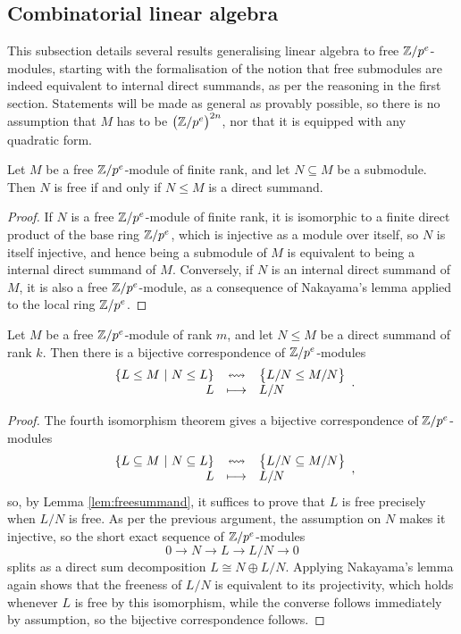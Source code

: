 \subsection{Combinatorial linear algebra}

This subsection details several results generalising linear algebra to free $ \mathbb{Z} / p^e $-modules, starting with the formalisation of the notion that free submodules are indeed equivalent to internal direct summands, as per the reasoning in the first section. Statements will be made as general as provably possible, so there is no assumption that $ M $ has to be $ \br{\ZZ / p^e}^{2n} $, nor that it is equipped with any quadratic form.

\begin{lemma}
\label{lem:freesummand}
Let $ M $ be a free $ \mathbb{Z} / p^e $-module of finite rank, and let $ N \subseteq M $ be a submodule. Then $ N $ is free if and only if $ N \le M $ is a direct summand.
\end{lemma}

\begin{proof}
If $ N $ is a free $ \mathbb{Z} / p^e $-module of finite rank, it is isomorphic to a finite direct product of the base ring $ \mathbb{Z} / p^e $, which is injective as a module over itself, so $ N $ is itself injective, and hence being a submodule of $ M $ is equivalent to being a internal direct summand of $ M $. Conversely, if $ N $ is an internal direct summand of $ M $, it is also a free $ \mathbb{Z} / p^e $-module, as a consequence of Nakayama's lemma applied to the local ring $ \mathbb{Z} / p^e $.
\end{proof}

\begin{proposition}
\label{prop:fourthisomorphism}
Let $ M $ be a free $ \mathbb{Z} / p^e $-module of rank $ m $, and let $ N \le M $ be a direct summand of rank $ k $. Then there is a bijective correspondence of $ \mathbb{Z} / p^e $-modules
$$ \bijection{\cbr{L \le M \st N \le L}}{\cbr{L / N \le M / N}}{L}{L / N}. $$
\end{proposition}

\begin{proof}
The fourth isomorphism theorem gives a bijective correspondence of $ \mathbb{Z} / p^e $-modules
$$ \bijection{\cbr{L \subseteq M \st N \subseteq L}}{\cbr{L / N \subseteq M / N}}{L}{L / N}, $$
so, by Lemma \ref{lem:freesummand}, it suffices to prove that $ L $ is free precisely when $ L / N $ is free. As per the previous argument, the assumption on $ N $ makes it injective, so the short exact sequence of $ \mathbb{Z} / p^e $-modules
$$ 0 \to N \to L \to L / N \to 0 $$
splits as a direct sum decomposition $ L \cong N \oplus L / N $. Applying Nakayama's lemma again shows that the freeness of $ L / N $ is equivalent to its projectivity, which holds whenever $ L $ is free by this isomorphism, while the converse follows immediately by assumption, so the bijective correspondence follows.
\end{proof}

